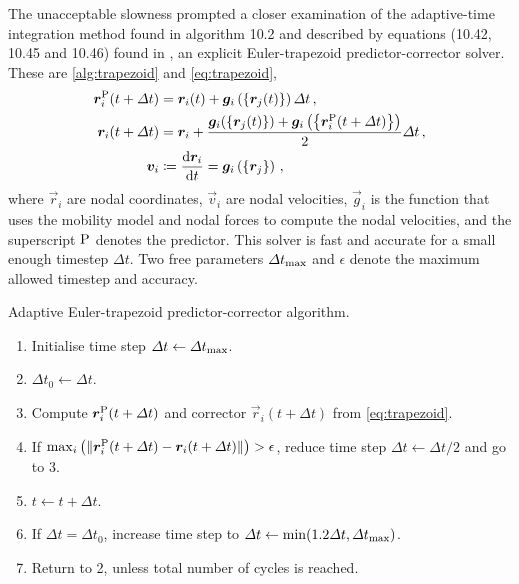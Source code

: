The unacceptable slowness prompted a closer examination of the adaptive-time integration method found in algorithm 10.2 and described by equations (10.42, 10.45 and 10.46) found in \cite[p.~214--216]{ddlab}, an explicit Euler-trapezoid predictor-corrector solver. These are \cref{alg:trapezoid} and \cref{eq:trapezoid},
\begin{align}\label{eq:trapezoid}
    \vec{r}_i^{\rvar{P}}(t + \Delta t) & = \vec{r}_i(t) + \vec{g}_i\left(\left\{ \vec{r}_j(t) \right\}\right) \Delta t\,,                                                                     \\
    \vec{r}_i(t + \Delta t)            & = \vec{r}_i + \dfrac{\vec{g}_i(\left\{\vec{r}_j(t)\right\}) + \vec{g}_i\left(\left\{\vec{r}_i^{\rvar{P}}(t + \Delta t)\right\}\right)}{2}\Delta t\,, \\
    \vec{v}_i                          & \coloneqq \dfrac{\rvar{d}\vec{r}_i}{\rvar{d}t} = \vec{g}_i\left(\left\{\vec{r}_j\right\}\right)\,,
\end{align}
where $\vec{r}_i$ are nodal coordinates, $\vec{v}_i$ are nodal velocities, $\vec{g}_i$ is the function that uses the mobility model and nodal forces to compute the nodal velocities, and the superscript $\textrm{P}$ denotes the predictor. This solver is fast and accurate for a small enough timestep $\Delta t$. Two free parameters $\Delta t_{\textrm{max}}$ and $\epsilon$ denote the maximum allowed timestep and accuracy.
\begin{algorithm}
    \caption{Adaptive Euler-trapezoid predictor-corrector algorithm.}
    \label{alg:trapezoid}
    \begin{enumerate}
        \item Initialise time step $\Delta t \gets \Delta t_{\textrm{max}}$.
        \item $\Delta t_0 \gets \Delta t$.
        \item Compute $\vec{r}_i^{\rvar{P}}(t + \Delta t)$ and corrector $\vec{r}_i(t + \Delta t)$ from \cref{eq:trapezoid}.
        \item If $\max_i\left(\lVert \vec{r}_i^{\rvar{P}}(t + \Delta t) - \vec{r}_i(t + \Delta t)\rVert\right) > \epsilon$, reduce time step $\Delta t \gets \Delta t / 2$ and go to 3.
        \item $t \gets t + \Delta t$.
        \item If $\Delta t = \Delta t_0$, increase time step to $\Delta t \gets \min(1.2 \Delta t, \Delta t_{\textrm{max}})$.
        \item Return to 2, unless total number of cycles is reached.
    \end{enumerate}
\end{algorithm}

